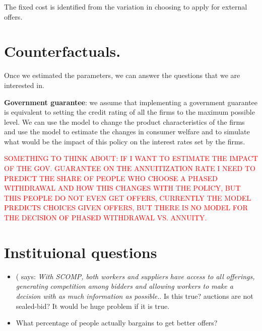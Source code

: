 \documentclass[12pt]{article}
\theoremstyle{plain}
\theoremstyle{plain}
\begin{document}
The fixed cost is identified from the variation in choosing to apply for external offers. 






\section{Counterfactuals.}

Once we estimated the parameters, we can answer the questions that we are interested in. 

\textbf{Government guarantee}: we assume that implementing a government guarantee is equivalent to setting the credit rating of all the firms to the maximum possible level. We can use the model to change the product characteristics of the firms and use the model to estimate the changes in consumer welfare and to simulate what would be the impact of this policy on the interest rates set by the firms. 

\textcolor{red}{SOMETHING TO THINK ABOUT: IF I WANT TO ESTIMATE THE IMPACT OF THE GOV. GUARANTEE ON THE ANNUITIZATION RATE I NEED TO PREDICT THE SHARE OF PEOPLE WHO CHOOSE A PHASED WITHDRAWAL AND HOW THIS CHANGES WITH THE POLICY, BUT THIS PEOPLE DO NOT EVEN GET OFFERS, CURRENTLY THE MODEL PREDICTS CHOICES GIVEN OFFERS, BUT THERE IS NO MODEL FOR THE DECISION OF PHASED WITHDRAWAL VS. ANNUITY.  }

\section{Instituional questions}

\begin{itemize}
    \item (\textcite[p. 391]{morales_chilean_2017} says: \textit{With SCOMP, both workers and suppliers have access to all offerings, generating competition among bidders and allowing workers to make a decision with as much information as possible.}. Is this true? auctions are not sealed-bid? It would be huge problem if it is true.  

    \item What percentage of people actually bargains to get better offers? 
    
\end{itemize}
\end{document}
